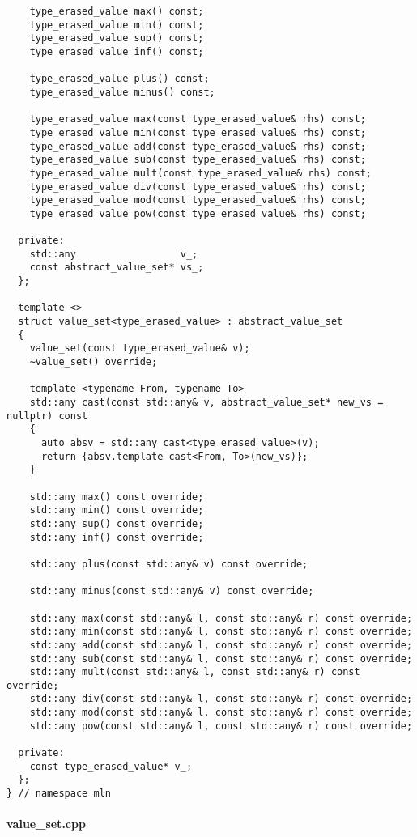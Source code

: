 \begin{verbatim}
    type_erased_value max() const;
    type_erased_value min() const;
    type_erased_value sup() const;
    type_erased_value inf() const;

    type_erased_value plus() const;
    type_erased_value minus() const;

    type_erased_value max(const type_erased_value& rhs) const;
    type_erased_value min(const type_erased_value& rhs) const;
    type_erased_value add(const type_erased_value& rhs) const;
    type_erased_value sub(const type_erased_value& rhs) const;
    type_erased_value mult(const type_erased_value& rhs) const;
    type_erased_value div(const type_erased_value& rhs) const;
    type_erased_value mod(const type_erased_value& rhs) const;
    type_erased_value pow(const type_erased_value& rhs) const;

  private:
    std::any                  v_;
    const abstract_value_set* vs_;
  };

  template <>
  struct value_set<type_erased_value> : abstract_value_set
  {
    value_set(const type_erased_value& v);
    ~value_set() override;

    template <typename From, typename To>
    std::any cast(const std::any& v, abstract_value_set* new_vs = nullptr) const
    {
      auto absv = std::any_cast<type_erased_value>(v);
      return {absv.template cast<From, To>(new_vs)};
    }

    std::any max() const override;
    std::any min() const override;
    std::any sup() const override;
    std::any inf() const override;

    std::any plus(const std::any& v) const override;

    std::any minus(const std::any& v) const override;

    std::any max(const std::any& l, const std::any& r) const override;
    std::any min(const std::any& l, const std::any& r) const override;
    std::any add(const std::any& l, const std::any& r) const override;
    std::any sub(const std::any& l, const std::any& r) const override;
    std::any mult(const std::any& l, const std::any& r) const override;
    std::any div(const std::any& l, const std::any& r) const override;
    std::any mod(const std::any& l, const std::any& r) const override;
    std::any pow(const std::any& l, const std::any& r) const override;

  private:
    const type_erased_value* v_;
  };
} // namespace mln
\end{verbatim}

\paragraph{value\_set.cpp}
\label{appendix:static-dynamic-bridge.mm.vs.value_set.cpp}

